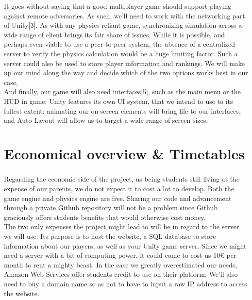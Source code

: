 It goes without saying that a good multiplayer game should support playing against remote adversaries. As such, we’ll need to work with the networking part of Unity[3]. As with any physics-reliant game, synchronizing simulation across a wide range of client brings its fair share of issues. While it is possible, and perhaps even viable to use a peer-to-peer system, the absence of a centralized server to verify the physics calculation would be a huge limiting factor. Such a server could also be used to store player information and rankings. We will make up our mind along the way and decide which of the two options works best in our case.\\

And finally, our game will also need interfaces[5], such as the main menu or the HUD in game. Unity features its own UI system, that we intend to use to its fullest extent: animating our on-screen elements will bring life to our interfaces, and Auto Layout will allow us to target a wide range of screen sizes.\\

\chapter{Economical overview \& Timetables}

\paragraph{}Regarding the economic side of the project, us being students still living at the expense of our parents, we do not expect it to cost a lot to develop. Both the game engine and physics engine are free. Sharing our code and advancement through a private Github repository will not be a problem since Github graciously offers students benefits that would otherwise cost money.\\

The two only expenses the project might lead to will be in regard to the server we will use. Its purpose is to host the website, a SQL database to store information about our players, as well as your Unity game server. Since we might need a server with a bit of computing power, it could come to cost us 10\euro{} per month to rent a mighty beast. In the case we greatly overestimated our needs, Amazon Web Services offer students credit to use on their platform. We’ll also need to buy a domain name so as not to have to input a raw IP address to access the website.
\newpage

